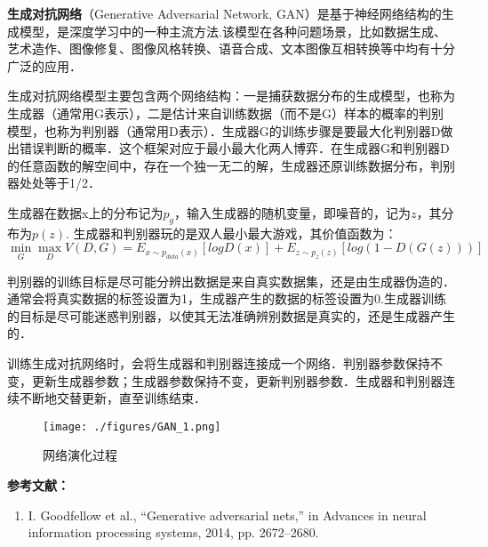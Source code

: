 
\textbf{生成对抗网络}（Generative Adversarial Network, GAN）是基于神经网络结构的生成模型，是深度学习中的一种主流方法.该模型在各种问题场景，比如数据生成、艺术造作、图像修复、图像风格转换、语音合成、文本图像互相转换等中均有十分广泛的应用．

生成对抗网络模型主要包含两个网络结构：一是捕获数据分布的生成模型，也称为生成器（通常用G表示），二是估计来自训练数据（而不是G）样本的概率的判别模型，也称为判别器（通常用D表示）．生成器G的训练步骤是要最大化判别器D做出错误判断的概率．这个框架对应于最小最大化两人博弈．在生成器G和判别器D的任意函数的解空间中，存在一个独一无二的解，生成器还原训练数据分布，判别器处处等于1/2．

生成器在数据x上的分布记为$p_g$，输入生成器的随机变量，即噪音的，记为$z$，其分布为$p(z)$.
生成器和判别器玩的是双人最小最大游戏，其价值函数为：
\begin{equation}
\mathop{\min}\limits_G \mathop {\max }\limits_D V(D,G)=E_{x\sim p_{data}(x)}[logD(x)]+E_{z\sim p_z(z)}[log(1-D(G(z)))]
\end{equation}


判别器的训练目标是尽可能分辨出数据是来自真实数据集，还是由生成器伪造的．通常会将真实数据的标签设置为1，生成器产生的数据的标签设置为0.生成器训练的目标是尽可能迷惑判别器，以使其无法准确辨别数据是真实的，还是生成器产生的．

训练生成对抗网络时，会将生成器和判别器连接成一个网络．判别器参数保持不变，更新生成器参数；生成器参数保持不变，更新判别器参数．生成器和判别器连续不断地交替更新，直至训练结束．
\begin{figure}[ht]
\centering
\texttt{[image: ./figures/GAN\_1.png]}
\caption{网络演化过程} \label{GAN_fig1}
\end{figure}





\textbf{参考文献：}
\begin{enumerate}
\item I. Goodfellow et al., “Generative adversarial nets,” in Advances in neural information processing systems, 2014, pp. 2672–2680.
\end{enumerate}